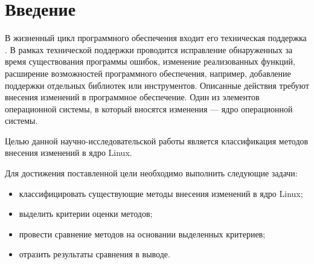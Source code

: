 \chapter*{Введение}

В жизненный цикл программного обеспечения входит его техническая поддержка \cite{life-cycle}. В рамках технической поддержки проводится  исправление обнаруженных за время существования программы ошибок, изменение реализованных функций, расширение возможностей программного обеспечения, например, добавление поддержки отдельных библиотек или инструментов. Описанные действия требуют внесения изменений в программное обеспечение. Один из элементов операционной системы, в который вносятся изменения --- ядро операционной системы.

Целью данной научно-исследовательской работы является классификация методов внесения изменений в ядро Linux.

Для достижения поставленной цели необходимо выполнить следующие задачи:

\begin{itemize}
	\item классифицировать существующие методы внесения изменений в ядро Linux;
	\item выделить критерии оценки методов;
	\item провести сравнение методов на основании выделенных критериев;
	\item отразить результаты сравнения в выводе.
\end{itemize}